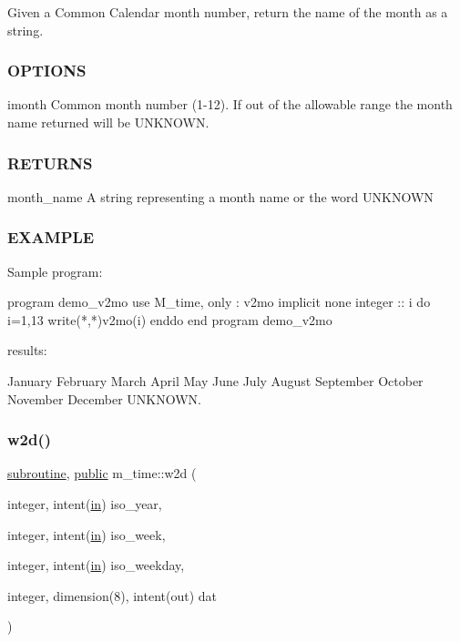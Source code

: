 \begin{DoxyVerb}
Given a Common Calendar month number, return the name of the month as a string.

\subsubsection*{O\+P\+T\+I\+O\+NS}

imonth Common month number (1-\/12). If out of the allowable range the month name returned will be \textquotesingle{}U\+N\+K\+N\+O\+WN\textquotesingle{}. \subsubsection*{R\+E\+T\+U\+R\+NS}

month\+\_\+name A string representing a month name or the word \textquotesingle{}U\+N\+K\+N\+O\+WN\textquotesingle{}

\subsubsection*{E\+X\+A\+M\+P\+LE}

\begin{DoxyVerb}Sample program:

 program demo_v2mo
 use M_time, only : v2mo
 implicit none
 integer :: i
    do i=1,13
       write(*,*)v2mo(i)
    enddo
 end program demo_v2mo

results:

 January
 February
 March
 April
 May
 June
 July
 August
 September
 October
 November
 December
 UNKNOWN. \end{DoxyVerb}
 \mbox{\label{namespacem__time_ac0ec48db8d508bfa23fe4b20c9d1c5a3}} 
\subsubsection{\texorpdfstring{w2d()}{w2d()}}
{\footnotesize\ttfamily \hyperlink{M__stopwatch_83_8txt_acfbcff50169d691ff02d4a123ed70482}{subroutine}, \hyperlink{M__stopwatch_83_8txt_a2f74811300c361e53b430611a7d1769f}{public} m\+\_\+time\+::w2d (\begin{DoxyParamCaption}\item[{integer, intent(\hyperlink{M__journal_83_8txt_afce72651d1eed785a2132bee863b2f38}{in})}]{iso\+\_\+year,  }\item[{integer, intent(\hyperlink{M__journal_83_8txt_afce72651d1eed785a2132bee863b2f38}{in})}]{iso\+\_\+week,  }\item[{integer, intent(\hyperlink{M__journal_83_8txt_afce72651d1eed785a2132bee863b2f38}{in})}]{iso\+\_\+weekday,  }\item[{integer, dimension(8), intent(out)}]{dat }\end{DoxyParamCaption})}




\end{DoxyVerb}
